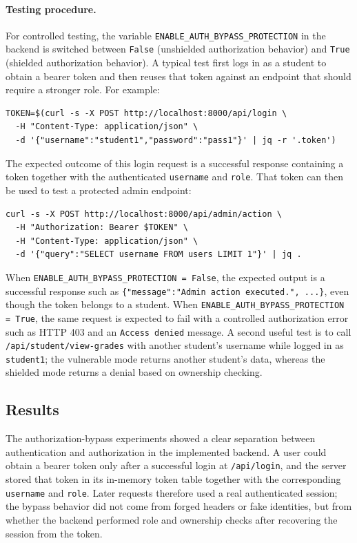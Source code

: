 \documentclass[11pt,a4paper]{article}
\begin{document}
\paragraph{Testing procedure.}
For controlled testing, the variable \texttt{ENABLE\_AUTH\_BYPASS\_PROTECTION} in the backend is switched between \texttt{False} (unshielded authorization behavior) and \texttt{True} (shielded authorization behavior). A typical test first logs in as a student to obtain a bearer token and then reuses that token against an endpoint that should require a stronger role. For example:

\begin{verbatim}
TOKEN=$(curl -s -X POST http://localhost:8000/api/login \
  -H "Content-Type: application/json" \
  -d '{"username":"student1","password":"pass1"}' | jq -r '.token')
\end{verbatim}

The expected outcome of this login request is a successful response containing a token together with the authenticated \texttt{username} and \texttt{role}. That token can then be used to test a protected admin endpoint:

\begin{verbatim}
curl -s -X POST http://localhost:8000/api/admin/action \
  -H "Authorization: Bearer $TOKEN" \
  -H "Content-Type: application/json" \
  -d '{"query":"SELECT username FROM users LIMIT 1"}' | jq .
\end{verbatim}

When \texttt{ENABLE\_AUTH\_BYPASS\_PROTECTION = False}, the expected output is a successful response such as \texttt{\{"message":"Admin action executed.", ...\}}, even though the token belongs to a student. When \texttt{ENABLE\_AUTH\_BYPASS\_PROTECTION = True}, the same request is expected to fail with a controlled authorization error such as HTTP 403 and an \texttt{Access denied} message. A second useful test is to call \texttt{/api/student/view-grades} with another student's username while logged in as \texttt{student1}; the vulnerable mode returns another student's data, whereas the shielded mode returns a denial based on ownership checking.

\subsection{Results}

The authorization-bypass experiments showed a clear separation between authentication and authorization in the implemented backend. A user could obtain a bearer token only after a successful login at \texttt{/api/login}, and the server stored that token in its in-memory token table together with the corresponding \texttt{username} and \texttt{role}. Later requests therefore used a real authenticated session; the bypass behavior did not come from forged headers or fake identities, but from whether the backend performed role and ownership checks after recovering the session from the token.
\end{document}
